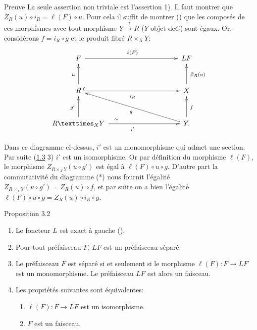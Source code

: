 \documentclass[10pt]{../fichiers-configuration-latex/smfart}
\begin{document}
\begin{enonce*}[remark]{Preuve}
La seule assertion non triviale est l'assertion 1). Il faut montrer
que $Z_R(u)\circ i_R=\ell(F)\circ u$. Pour cela il suffit de montrer
() que les composés de ces morphismes avec tout
morphisme $Y\xrightarrow{g}R$ ($Y$ objet de\pageoriginale $C$) sont
égaux. Or, considérons $f=i_R\circ g$ et le produit fibré $R\times_X
Y$:
\[\vcenter{
\xymatrix@L=5pt@R=1cm@C=3.5cm@M=.2cm{
F  \ar[r]^{\ell(F)}   & LF \\
R \ar[u]^{u}        \ar@{^{(}->}_{i_R}[r]  & X \ar[u]_{Z_R(u)} \\
\fprod{R}{Y}{X} \ar[u]^{g'} \ar[r]^(.35){\sim}_{i'} & Y
\ar[lu]^{g}\ar[u]_{f}. }}
\]

Dans ce diagramme ci-dessus, $i'$ est un monomorphisme qui admet une
section. Par suite (\hyperref[II.def1.3]{1.3} 3) $i'$ est un isomorphisme. Or
par définition du morphisme $\ell(F)$, le morphisme $Z_{R\times_X
  Y}(u\circ g')$ est égal à $\ell(F)\circ u\circ g$. D'autre part
la commutativité du diagramme (*) nous fournit l'égalité
$Z_{R\times_X Y}(u\circ g')=Z_R(u)\circ f$, et par suite on a bien
l'égalité $\ell(F)\circ u\circ g=Z_R(u)\circ i_R \circ g$.
\end{enonce*}

\begin{enonce*}{Proposition 3.2}
\begin{enumerate}
\renewcommand{\labelenumi}{\theenumi)}
\item Le foncteur $L$ est exact à gauche {\rm().}

\item Pour tout préfaisceau $F$, $LF$ est un préfaisceau
  séparé.

\item Le préfaisceau $F$ est séparé si et seulement si le
  morphisme $\ell(F):F\rightarrow LF$ est un monomorphisme. Le
  préfaisceau $LF$ est alors un faisceau.

\item Les propriétés suivantes sont équivalentes:
\begin{enumerate}
\renewcommand{\theenumii}{\roman{enumii}}
\renewcommand{\labelenumii}{(\theenumii)}
\item $\ell(F):F\rightarrow LF$ est un isomorphisme.

\item $F$ est un faisceau.
\end{enumerate}
\end{enumerate}
\end{enonce*}
\end{document}
